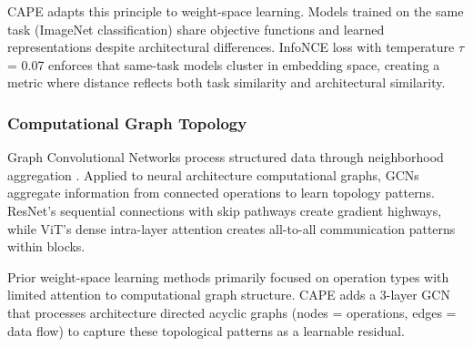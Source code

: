 CAPE adapts this principle to weight-space learning. Models trained on the same task (ImageNet classification) share objective functions and learned representations despite architectural differences. InfoNCE loss with temperature $\tau$ = 0.07 enforces that same-task models cluster in embedding space, creating a metric where distance reflects both task similarity and architectural similarity.

\subsubsection{Computational Graph Topology}

Graph Convolutional Networks process structured data through neighborhood aggregation \citep{Kipf2017}. Applied to neural architecture computational graphs, GCNs aggregate information from connected operations to learn topology patterns. ResNet's sequential connections with skip pathways create gradient highways, while ViT's dense intra-layer attention creates all-to-all communication patterns within blocks.

Prior weight-space learning methods primarily focused on operation types with limited attention to computational graph structure. CAPE adds a 3-layer GCN that processes architecture directed acyclic graphs (nodes = operations, edges = data flow) to capture these topological patterns as a learnable residual.
